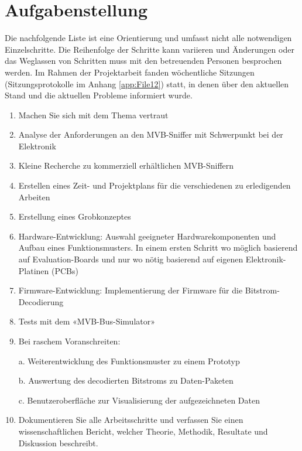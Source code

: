 
\section{Aufgabenstellung}
\label{Aufgabenstellung} %

Die nachfolgende Liste ist eine Orientierung und umfasst nicht alle notwendigen Einzelschritte. Die Reihenfolge der Schritte kann variieren und Änderungen oder das Weglassen von Schritten muss mit den betreuenden Personen besprochen werden. Im Rahmen der Projektarbeit fanden wöchentliche Sitzungen (Sitzungsprotokolle im Anhang \ref{app:File12}) statt, in denen über den aktuellen Stand und die aktuellen Probleme informiert wurde.
 \begin{enumerate}
     \item Machen Sie sich mit dem Thema vertraut
     \item Analyse der Anforderungen an den MVB-Sniffer mit Schwerpunkt bei der Elektronik 
     \item Kleine Recherche zu kommerziell erhältlichen MVB-Sniffern
     \item Erstellen eines Zeit- und Projektplans für die verschiedenen zu erledigenden Arbeiten
     \item Erstellung eines Grobkonzeptes
     \item Hardware-Entwicklung: Auswahl geeigneter Hardwarekomponenten und Aufbau eines 
     Funktionsmusters. In einem ersten Schritt wo möglich basierend auf Evaluation-Boards und nur wo 
     nötig basierend auf eigenen Elektronik-Platinen (PCBs)
     \item Firmware-Entwicklung: Implementierung der Firmware für die Bitstrom-Decodierung
     \item Tests mit dem «MVB-Bus-Simulator»
     \item Bei raschem Voranschreiten: 
     
a. Weiterentwicklung des Funktionsmuster zu einem Prototyp 

b. Auswertung des decodierten Bitstroms zu Daten-Paketen 

c. Benutzeroberfläche zur Visualisierung der aufgezeichneten Daten 
     \item Dokumentieren Sie alle Arbeitsschritte und verfassen Sie einen wissenschaftlichen Bericht, welcher Theorie, Methodik, Resultate und Diskussion beschreibt.
     \end{enumerate}

